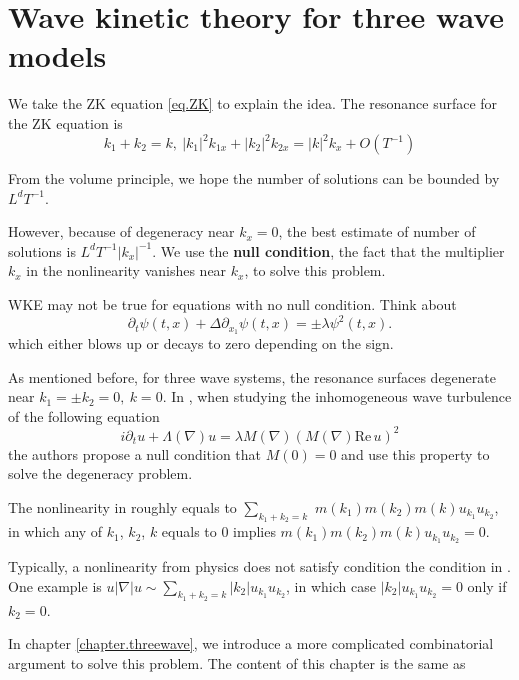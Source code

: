 \section{Wave kinetic theory for three wave models}

We take the ZK equation \eqref{eq.ZK} to explain the idea. The resonance surface for the ZK equation is 
\begin{equation}
    k_1 + k_2 = k,\ |k_1|^2k_{1x} + |k_2|^2k_{2x} = |k|^2k_{x} + O(T^{-1})
\end{equation}

From the volume principle, we hope the number of solutions can be bounded by $L^d T^{-1}$.



However, because of degeneracy near $k_x = 0$, the best estimate of number of solutions is $L^d T^{-1} |k_x|^{-1}$. We use the \textbf{null condition}, the fact that the multiplier $k_x$ in the nonlinearity vanishes near $k_x$, to solve this problem. 

WKE may not be true for equations with no null condition. Think about
\begin{equation}
    \partial_t\psi(t,x)+\Delta\partial_{x_1}\psi(t,x)=\pm\lambda \psi^2(t,x).
\end{equation}
which either blows up or decays to zero depending on the sign.
    

As mentioned before, for three wave systems, the resonance surfaces degenerate near $k_1 = \pm k_2 = 0,\ k=0$. In \cite{ampatzoglou2021derivation}, when studying the inhomogeneous wave turbulence of the following equation
\begin{equation}
    i\partial_t u + \Lambda(\nabla)u = \lambda M(\nabla)(M(\nabla)\text{Re}\, u)^2
\end{equation}
the authors propose a null condition that $M(0) = 0$ and use this property to solve the degeneracy problem.
    

    
The nonlinearity in \cite{ampatzoglou2021derivation} roughly equals to $\sum_{k_1+k_2=k}$ $m(k_1)m(k_2)m(k)u_{k_1}u_{k_2}$, in which any of $k_1$, $k_2$, $k$ equals to $0$ implies $m(k_1)m(k_2)m(k)u_{k_1}u_{k_2} = 0$.

Typically, a nonlinearity from physics does not satisfy condition the condition in \cite{ampatzoglou2021derivation}. One example is $u|\nabla|u\sim\sum_{k_1+k_2=k}|k_2|u_{k_1}u_{k_2}$, in which case $|k_2|u_{k_1}u_{k_2}=0$ only if $k_2 = 0$. 

In chapter \ref{chapter.threewave}, we introduce a more complicated combinatorial argument to solve this problem. The content of this chapter is the same as \cite{ma2022almost} 